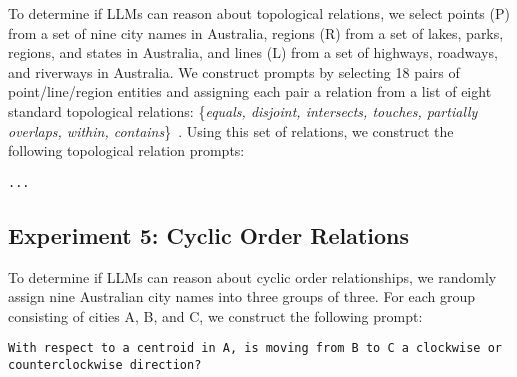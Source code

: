 
To determine if LLMs can reason about topological relations, we select points (P) from a set of nine city names in Australia, regions (R) from a set of lakes, parks, regions, and states in Australia, and lines (L) from a set of highways, roadways, and riverways in Australia.
We construct prompts by selecting 18 pairs of point/line/region entities and assigning each pair a relation from a list of eight standard topological relations: \{\textit{equals, disjoint, intersects, touches, partially overlaps, within, contains}\}~\cite{Carniel2023}.
Using this set of relations, we construct the following topological relation prompts:

\begin{lstlisting}[title=text here]
    ...
\end{lstlisting}





\subsection{Experiment 5: Cyclic Order Relations}


To determine if LLMs can reason about cyclic order relationships, we randomly assign nine Australian city names into three groups of three.
For each group consisting of cities A, B, and C, we construct the following prompt: 

\begin{lstlisting}[title=text here]
    With respect to a centroid in A, is moving from B to C a clockwise or counterclockwise direction?
\end{lstlisting}

